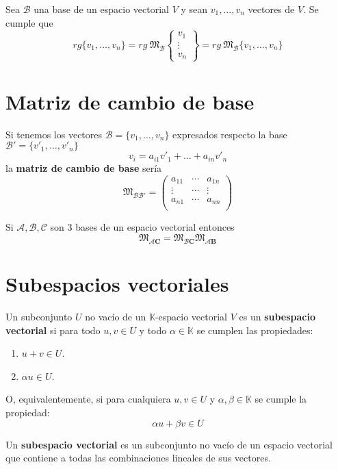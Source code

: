 \begin{prop}
	Sea $\mathcal{B}$ una base de un espacio vectorial $V$ y sean $v_1,\ldots,v_n$ vectores de $V$. Se cumple que
	\[
	rg \lbrace v_1,\ldots,v_n \rbrace = rg\ \mathfrak{M}_{\mathcal{B}} \left\lbrace
	\begin{array}{c}
	v_1 \\ \vdots \\ v_n 
	\end{array}
	\right\rbrace =
	rg\ \mathfrak{M}_{\mathcal{B}} \lbrace v_1, \ldots, v_n \rbrace
	\]
\end{prop}

\section{Matriz de cambio de base}

Si tenemos los vectores $\mathcal{B}=\lbrace v_1,\ldots,v_n \rbrace$ expresados respecto la base $\mathcal{B'}=\lbrace v'_1,\ldots,v'_n \rbrace$ 
\[
v_i = a_{i1}v'_1 + \ldots + a_{in}v'_n 
\]
la \textbf{matriz de cambio de base} sería
\[
\mathfrak{M}_{\mathcal{B}\mathcal{B'}} = \begin{pmatrix}
a_{11} & \cdots & a_{1n} \\
\vdots & \cdots & \vdots \\
a_{n1} & \cdots & a_{nn} \\
\end{pmatrix}
\]

\begin{prop}
	Si $\mathcal{A},\mathcal{B},\mathcal{C}$ son 3 bases de un espacio vectorial entonces
	\[
	\mathfrak{M}_{\mathcal{A}\textbf{C}} = \mathfrak{M}_{\mathcal{B}\textbf{C}}\mathfrak{M}_{\mathcal{A}\textbf{B}}
	\]
\end{prop}

\section{Subespacios vectoriales}

\begin{defi}
	Un subconjunto $U$ no vacío de un $\mathbb{K}$-espacio vectorial $V$ es un \textbf{subespacio vectorial} si para todo $u,v \in U$ y todo $\alpha \in \mathbb{K}$ se cumplen las propiedades:
	\begin{enumerate}
		\item $u+v \in U$.
		\item $\alpha u \in U$.
	\end{enumerate}
	O, equivalentemente, si para cualquiera $u,v \in U$ y $\alpha,\beta \in \mathbb{K}$ se cumple la propiedad:
	\[
	\alpha u + \beta v \in U
	\]	
	
	Un \textbf{subespacio vectorial} es un subconjunto no vacío de un espacio vectorial que contiene a todas las combinaciones lineales de sus vectores.
\end{defi}

